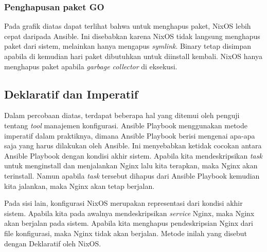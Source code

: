 \documentclass[10pt,]{report}
\begin{document}
\begin{adjustwidth}{20pt}{}
	\subsubsection{Penghapusan paket GO}
	\begin{adjustwidth}{20pt}{}
		Pada grafik diatas dapat terlihat bahwa untuk menghapus paket, NixOS
		lebih cepat daripada Ansible. Ini disebabkan karena NixOS tidak langsung menghapus
		paket dari sistem, melainkan hanya mengapus \textit{symlink}. Binary tetap
		disimpan apabila di kemudian hari paket dibutuhkan untuk diinstall kembali.
		NixOS hanya menghapus paket apabila \textit{garbage collector} di eksekusi.
	\end{adjustwidth}
	\subsection{Deklaratif dan Imperatif}
	\begin{adjustwidth}{20pt}{}
		Dalam percobaan diatas, terdapat beberapa hal yang ditemui oleh penguji tentang
		\textit{tool} manajemen konfigurasi. Ansible Playbook menggunakan metode imperatif
		dalam praktiknya, dimana Ansible Playbook berisi mengenai apa-apa saja yang harus dilakukan
		oleh Ansible. Ini menyebabkan ketidak cocokan antara Ansible Playbook dengan
		kondisi akhir sistem. Apabila kita mendeskripsikan \textit{task} untuk menginstall
		dan menjalankan Nginx lalu kita terapkan, maka Nginx akan terinstall. Namun
		apabila \textit{task} tersebut dihapus dari Ansible Playbook kemudian kita
		jalankan, maka Nginx akan tetap berjalan.

		Pada sisi lain, konfigurasi NixOS merupakan representasi dari kondisi akhir sistem.
		Apabila kita pada awalnya mendeskripsikan \textit{service} Nginx, maka Nginx akan
		berjalan pada sistem. Apabila kita menghapus pendeskripsian Nginx dari file konfigurasi,
		maka Nginx tidak akan berjalan. Metode inilah yang disebut dengan Deklaratif oleh
		NixOS.


\end{adjustwidth}
\end{adjustwidth}
\end{document}
